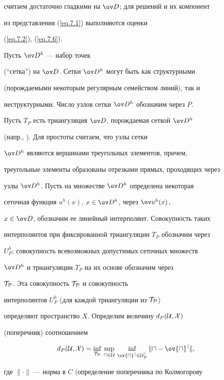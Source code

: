 считаем достаточно гладкими на $\od$; для решений и их компонент


из представления (\ref{eq.7.1}) выполняются оценки


(\ref{eq.7.2}), (\ref{eq.7.6}).





Пусть $\od{}^h$ --- набор точек


(``сетка'') на $\od$. Сетки $\od{}^h$ могут быть как структурными


(порождаемыми некоторым регулярным семейством линий), так и


неструктурными. Число узлов сетки $\od{}^h$ обозначим через $P$.


Пусть $T_P$ есть триангуляция $\od$, порождаемая сеткой $\od{}^h$


(напр., \cite{11}). Для простоты считаем, что узлы сетки


$\od{}^h$ являются вершинами треугольных элементов, причем,


треугольные элементы образованы отрезками прямых, проходящих через


узлы $\od{}^h$. Пусть на множестве $\od{}^h$ определена некоторая


сеточная функция $u^h(x)$, $x\in\od{}^h$, через $\ov u{}^h(x)$,


$x\in\od$, обозначим ее линейный интерполянт. Совокупность таких


интерполянтов при фиксированной триангуляции $T_P$ обозначим через


$U^h_P$; совокупность всевозможных допустимых сеточных множеств


$\od{}^h$ и триангуляции $T_P$ на их основе обозначим через


$\cal{T}_P$. Эта совокупность $\cal{T}_P$ и совокупность


интерполянтов $U^h_P$ (для каждой триангуляции из $\cal{T}_P$)


определяют пространство $X$. Определим величину $d_P(\cal{U},X)$


(поперечник) соотношением


\begin{equation}\label{eq.5.1}


d_P(\cu,X)=\inf_{\cal{T}_P}\,\sup_{u\in\cu}\,


\inf_{\ov{u}^h\in U_P^h}\|u-\ov{u}^h\|,


\end{equation}


где $\|\cdot\|$ --- норма в $C$ (определение поперечника по Колмогорову



